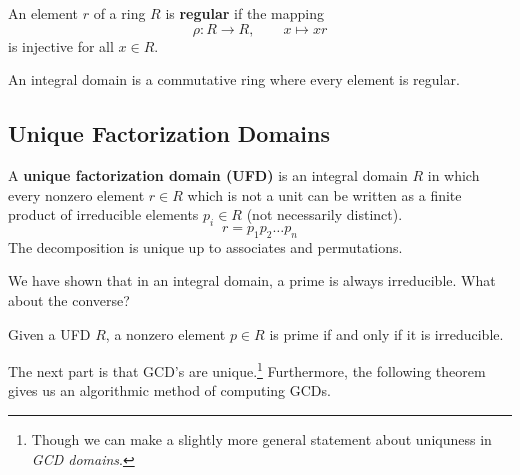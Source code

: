   \begin{definition}
    \label{def:regular-elements}
     An element $r$ of a ring $R$ is \textbf{regular} if the mapping 
     \begin{equation}
       \rho: R \to R, \qquad x \mapsto x r
     \end{equation}
    is injective for all $x \in R$. 
  \end{definition}

  \begin{theorem}
    \label{thm:integral-domains-w-r-t-regularity}
    An integral domain is a commutative ring where every element is regular. 
  \end{theorem} 

\subsection{Unique Factorization Domains}

  \begin{definition}
    \label{def:unique-factorization-domain}
    A \textbf{unique factorization domain (UFD)} is an integral domain $R$ in which every nonzero element $r \in R$ which is not a unit 
    can be written as a finite product of irreducible elements $p_i \in R$ (not necessarily distinct). 
    \begin{equation}
      r = p_1 p_2 \ldots p_n
    \end{equation}
    The decomposition is unique up to associates and permutations. 
  \end{definition}

  We have shown that in an integral domain, a prime is always irreducible. What about the converse? 

  \begin{theorem}
    \label{thm:primes-and-irreducibility-are-equivalent-in-ufds}
    Given a UFD $R$, a nonzero element $p \in R$ is prime if and only if it is irreducible. 
  \end{theorem}

  The next part is that GCD's are unique.\footnote{Though we can make a slightly more general statement about uniquness in \textit{GCD domains}.} Furthermore, the following theorem gives us an algorithmic method of computing GCDs.

